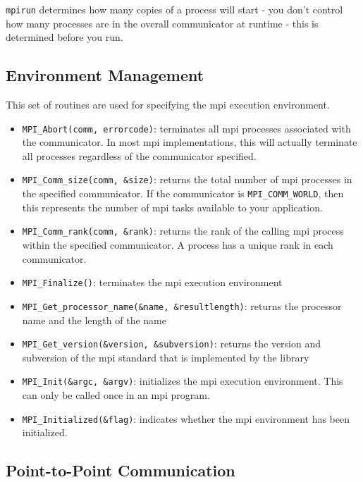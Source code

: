 \documentclass[10pt]{article}
\begin{document}
\begin{flushleft}
{\tt mpirun} determines how many copies of a process will start - you don't control how many processes are in the overall communicator at runtime - this is determined before you run. 



\subsection{Environment Management}

This set of routines are used for specifying the \gls{mpi} execution environment. 

\begin{itemize}
\item {\tt MPI\_Abort(comm, errorcode)}: terminates all \gls{mpi} processes associated with the communicator. In most \gls{mpi} implementations, this will actually terminate all processes regardless of the communicator specified.
\item {\tt MPI\_Comm\_size(comm, \&size)}: returns the total number of \gls{mpi} processes in the specified communicator. If the communicator is {\tt MPI\_COMM\_WORLD}, then this represents the number of \gls{mpi} tasks available to your application.
\item {\tt MPI\_Comm\_rank(comm, \&rank)}: returns the rank of the calling \gls{mpi} process within the specified communicator. A process has a unique rank in each communicator.
\item {\tt MPI\_Finalize()}: terminates the \gls{mpi} execution environment
\item {\tt MPI\_Get\_processor\_name(\&name, \&resultlength)}: returns the processor name and the length of the name
\item {\tt MPI\_Get\_version(\&version, \&subversion)}: returns the version and subversion of the \gls{mpi} standard that is implemented by the library
\item {\tt MPI\_Init(\&argc, \&argv)}: initializes the \gls{mpi} execution environment. This can only be called once in an \gls{mpi} program.
\item {\tt MPI\_Initialized(\&flag)}: indicates whether the \gls{mpi} environment has been initialized. 
\end{itemize}

\subsection{Point-to-Point Communication}


\end{flushleft}
\end{document}

